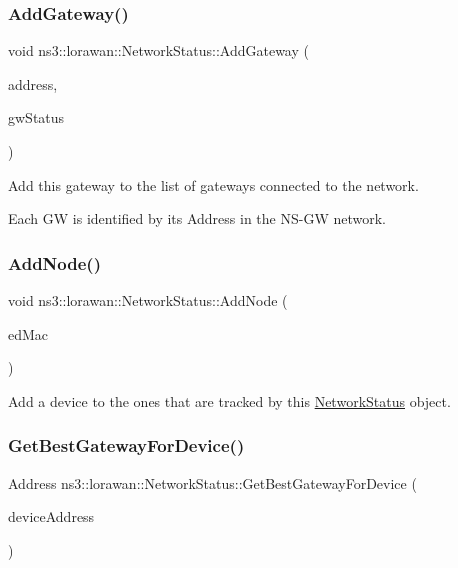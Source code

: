 \subsubsection{\texorpdfstring{Add\+Gateway()}{AddGateway()}}
{\footnotesize\ttfamily void ns3\+::lorawan\+::\+Network\+Status\+::\+Add\+Gateway (\begin{DoxyParamCaption}\item[{Address \&}]{address,  }\item[{Ptr$<$ \hyperlink{classns3_1_1lorawan_1_1GatewayStatus}{Gateway\+Status} $>$}]{gw\+Status }\end{DoxyParamCaption})}

Add this gateway to the list of gateways connected to the network.

Each GW is identified by its Address in the N\+S-\/\+GW network. \mbox{\label{classns3_1_1lorawan_1_1NetworkStatus_afa1672e18a2f461795bcc625c62208fd}} 
\subsubsection{\texorpdfstring{Add\+Node()}{AddNode()}}
{\footnotesize\ttfamily void ns3\+::lorawan\+::\+Network\+Status\+::\+Add\+Node (\begin{DoxyParamCaption}\item[{Ptr$<$ \hyperlink{classns3_1_1lorawan_1_1EndDeviceLoraMac}{End\+Device\+Lora\+Mac} $>$}]{ed\+Mac }\end{DoxyParamCaption})}

Add a device to the ones that are tracked by this \hyperlink{classns3_1_1lorawan_1_1NetworkStatus}{Network\+Status} object. \mbox{\label{classns3_1_1lorawan_1_1NetworkStatus_a1febf85e27405aefebab17c2860c3c35}} 
\subsubsection{\texorpdfstring{Get\+Best\+Gateway\+For\+Device()}{GetBestGatewayForDevice()}}
{\footnotesize\ttfamily Address ns3\+::lorawan\+::\+Network\+Status\+::\+Get\+Best\+Gateway\+For\+Device (\begin{DoxyParamCaption}\item[{\hyperlink{classns3_1_1lorawan_1_1LoraDeviceAddress}{Lora\+Device\+Address}}]{device\+Address }\end{DoxyParamCaption})}

